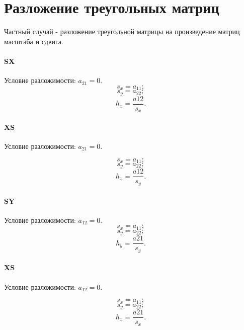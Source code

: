 \section{Разложение треугольных матриц}

Частный случай - разложение треугольной матрицы на произведение матриц масштаба и сдвига.

\paragraph{SX}

Условие разложимости: $a_21 = 0$.
$$s_x = a_{11};$$
$$s_y = a_{22};$$
$$h_x = \frac{a{12}}{s_x}.$$

\paragraph{XS}

Условие разложимости: $a_21 = 0$.

$$s_x = a_{11};$$
$$s_y = a_{22};$$
$$h_x = \frac{a{12}}{s_y}.$$


\paragraph{SY}

Условие разложимости: $a_12 = 0$.
$$s_x = a_{11};$$
$$s_y = a_{22};$$
$$h_y = \frac{a{21}}{s_y}.$$

\paragraph{XS}

Условие разложимости: $a_12 = 0$.

$$s_x = a_{11};$$
$$s_y = a_{22};$$
$$h_x = \frac{a{21}}{s_x}.$$

